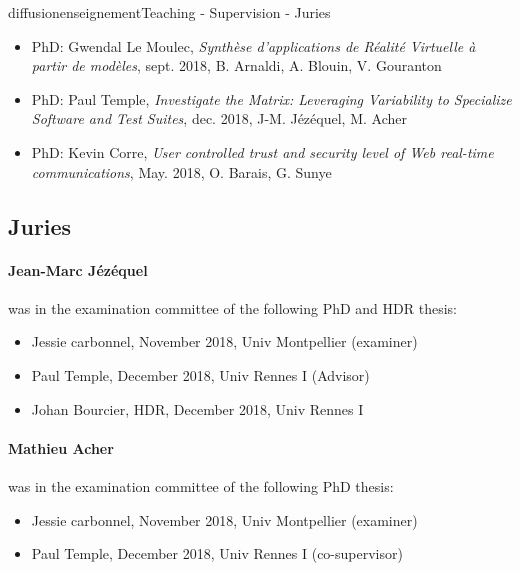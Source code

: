 \documentclass{ra2018}
\begin{document}
\begin{module}{diffusion}{enseignement}{Teaching - Supervision - Juries}
\begin{itemize}
\item PhD: Gwendal Le Moulec, \emph{Synthèse d'applications de Réalité Virtuelle à partir de modèles}, sept. 2018, B. Arnaldi, A. Blouin, V. Gouranton
\item PhD: Paul Temple, \emph{Investigate the Matrix: Leveraging Variability to Specialize Software and Test Suites}, dec. 2018, J-M. Jézéquel, M. Acher
\item PhD: Kevin Corre, \emph{User controlled trust and security level of Web real-time communications}, May. 2018, O. Barais, G. Sunye




\end{itemize} 


\subsection {Juries}

\paragraph*{Jean-Marc J\'ez\'equel} was in the examination committee of 
the following PhD and HDR thesis:
\begin{itemize}
	\item Jessie carbonnel, November 2018, Univ Montpellier (examiner)
	\item Paul Temple, December 2018, Univ Rennes I (Advisor)
	\item Johan Bourcier, HDR, December 2018, Univ Rennes I
\end{itemize}

\paragraph*{Mathieu Acher} was in the examination committee of the following PhD thesis: 
\begin{itemize}
	\item Jessie carbonnel, November 2018, Univ Montpellier (examiner)
	\item Paul Temple, December 2018, Univ Rennes I (co-supervisor) 
\end{itemize}


\end{module}
\end{document}
